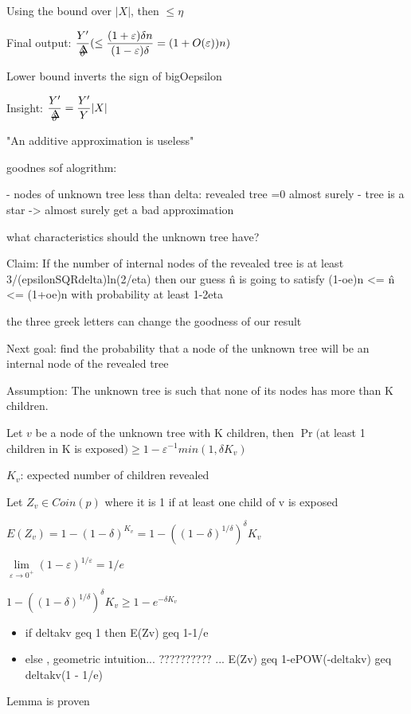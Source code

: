 \documentclass{report}
\begin{document}
	Using the bound over $|X|$, then $\leq \eta$
	
	Final output: $\displaystyle \frac{Y'}{\mathaccent 1 \delta } (\leq  \frac{(1 + \varepsilon)\delta n}{(1 - \varepsilon)\delta} = (1+O(\varepsilon))n )$
	
	Lower bound inverts the sign of bigOepsilon
	
	Insight: $\displaystyle \frac{Y'}{\mathaccent 1 \delta } = \frac{Y'}{Y}|X|$
	
	
	
	"An additive approximation is useless"
	
	
	goodnes sof alogrithm:
	
	 - nodes of unknown tree less than delta: revealed tree =0 almost surely
	 - tree is a star -> almost surely get a bad approximation
	 
	what characteristics should the unknown tree have?
	
	Claim: If the number of internal nodes of the revealed tree is at least 3/(epsilonSQRdelta)ln(2/eta) then our guess \^n is going to satisfy (1-oe)n <= \^n <= (1+oe)n with probability at least 1-2eta
	
	the three greek letters can change the goodness of our result
	
	Next goal: find the probability that a node of the unknown tree will be an internal node of the revealed tree
	
	Assumption: The unknown tree is such that none of its nodes has more than K children.
	
	Let $v$ be a node of the unknown tree with K children, then $\Pr($at least 1 children in K is exposed$) \geq 1-\varepsilon^{-1}min(1, \delta K_v)$
	
	$K_v$: expected number of children revealed
	
	Let $Z_v \in Coin(p)$ where it is 1 if at least one child of v is exposed
	
	$\displaystyle E(Z_v) = 1 - (1 - \delta)^{K_v} = 1 - ((1 - \delta)^{1/\delta})^\delta{K_v}$
	
	$\lim\limits_{\varepsilon \to 0^+}(1-\varepsilon)^{1/\varepsilon} = 1/e$
	
	$1 - ((1 - \delta)^{1/\delta})^\delta{K_v} \geq 1- e^{-\delta K_v}$
	
	
	\begin{itemize}
		\item if deltakv geq 1 then E(Zv) geq 1-1/e
		\item else , geometric intuition... ?????????? ... E(Zv) geq 1-ePOW(-deltakv) geq deltakv(1 - 1/e)
	\end{itemize}
	Lemma is proven
	
\end{document}
